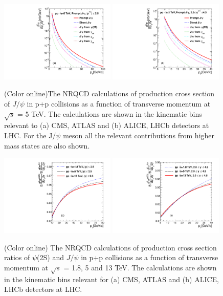 \documentclass[aps,prc,preprint,superscriptaddress,showpacs,showkeys,amsmath]{revtex4-1}
\begin{document}
\begin{figure}
\includegraphics[width=0.49\textwidth]{Fig_ATLAS_D2NDPtDy_RootS5TeV_PromptJPsi_Y2525.pdf}
\includegraphics[width=0.49\textwidth]{Fig_ALICE_D2NDPtDy_RootS5TeV_PromptJPsi_Y2045.pdf}
\caption{(Color online)The NRQCD calculations of production cross section of $J/\psi$ in p+p collisions 
  as a function of transverse momentum at $\sqrt{s}$ = 5 TeV. The calculations are shown in the kinematic
  bins relevant to (a) CMS, ATLAS and (b) ALICE, LHCb detectors at LHC. For the J/$\psi$ meson all the 
  relevant contributions from higher mass states are also shown.
}
\label{Fig:SigmaJPsi5TeV}
\end{figure}


\begin{figure}
\includegraphics[width=0.49\textwidth]{Fig_ATLAS_D2NDPtDy_DirectPsi_DirectJPsi_Y2525.pdf}
\includegraphics[width=0.49\textwidth]{Fig_ALICE_2045_RootS5TeV_Psi_JPsi_Pt.pdf}
\caption{(Color online) The NRQCD calculations of production cross section ratios of $\psi$(2S) and $J/\psi$
  in p+p collisions as a function of transverse momentum at $\sqrt{s}$ = 1.8, 5 and 13 TeV. 
The calculations are shown in  the kinematic bins relevant for (a) CMS, ATLAS and (b) ALICE, LHCb 
detectors at LHC. 
}
\label{Fig:RatioSigma_13TeV}
\end{figure}
\end{document}
